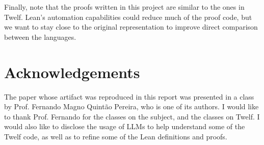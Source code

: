 \documentclass[]{NobArticle}
\begin{document}
Finally, note that the proofs written in this project are similar to the ones in Twelf. Lean's automation capabilities could reduce much of the proof code, but we want to stay close to the original representation to improve direct comparison between the languages.

\section*{Acknowledgements}

The paper whose artifact was reproduced in this report was presented in a class by Prof. Fernando Magno Quintão Pereira, who is one of its authors. I would like to thank Prof. Fernando for the classes on the subject, and the classes on Twelf. I would also like to disclose the usage of LLMs to help understand some of the Twelf code, as well as to refine some of the Lean definitions and proofs.


\printbibliography[
  title=\refname\label{sec:bib},
]
\end{document}
